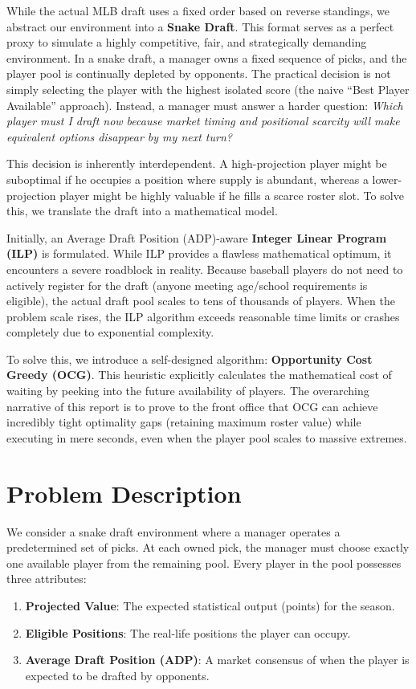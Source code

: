 \documentclass[11pt,a4paper]{article}
\begin{document}
While the actual MLB draft uses a fixed order based on reverse standings, we abstract our environment into a \textbf{Snake Draft}. This format serves as a perfect proxy to simulate a highly competitive, fair, and strategically demanding environment. In a snake draft, a manager owns a fixed sequence of picks, and the player pool is continually depleted by opponents. The practical decision is not simply selecting the player with the highest isolated score (the naive ``Best Player Available'' approach). Instead, a manager must answer a harder question: \textit{Which player must I draft now because market timing and positional scarcity will make equivalent options disappear by my next turn?}

This decision is inherently interdependent. A high-projection player might be suboptimal if he occupies a position where supply is abundant, whereas a lower-projection player might be highly valuable if he fills a scarce roster slot. To solve this, we translate the draft into a mathematical model. 

Initially, an Average Draft Position (ADP)-aware \textbf{Integer Linear Program (ILP)} is formulated. While ILP provides a flawless mathematical optimum, it encounters a severe roadblock in reality. Because baseball players do not need to actively register for the draft (anyone meeting age/school requirements is eligible), the actual draft pool scales to tens of thousands of players. When the problem scale rises, the ILP algorithm exceeds reasonable time limits or crashes completely due to exponential complexity.

To solve this, we introduce a self-designed algorithm: \textbf{Opportunity Cost Greedy (OCG)}. This heuristic explicitly calculates the mathematical cost of waiting by peeking into the future availability of players. The overarching narrative of this report is to prove to the front office that OCG can achieve incredibly tight optimality gaps (retaining maximum roster value) while executing in mere seconds, even when the player pool scales to massive extremes.

\section{Problem Description}

We consider a snake draft environment where a manager operates a predetermined set of picks. At each owned pick, the manager must choose exactly one available player from the remaining pool. Every player in the pool possesses three attributes:
\begin{enumerate}
    \item \textbf{Projected Value}: The expected statistical output (points) for the season.
    \item \textbf{Eligible Positions}: The real-life positions the player can occupy.
    \item \textbf{Average Draft Position (ADP)}: A market consensus of when the player is expected to be drafted by opponents.
\end{enumerate}
\end{document}
